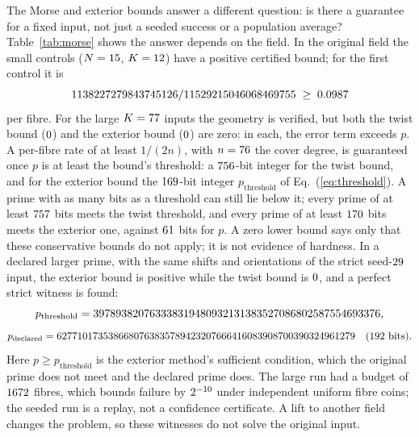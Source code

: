 \documentclass[10pt]{article}
\begin{document}
The Morse and exterior bounds answer a different question: is there a guarantee for a fixed input, not just a seeded success or a population average? Table~\ref{tab:morse} shows the answer depends on the field. In the original field the small controls ($N=15$, $K=12$) have a positive certified bound; for the first control it is
\[
1138227279843745126/11529215046068469755 \;\ge\; 0.0987
\]
per fibre. For the large $K=77$ inputs the geometry is verified, but both the twist bound ($0$) and the exterior bound ($0$) are zero: in each, the error term exceeds $p$. A per-fibre rate of at least $1/(2n)$, with $n=76$ the cover degree, is guaranteed once $p$ is at least the bound's threshold: a $756$-bit integer for the twist bound, and for the exterior bound the $169$-bit integer $p_{\text{threshold}}$ of Eq.~(\ref{eq:threshold}). A prime with as many bits as a threshold can still lie below it; every prime of at least $757$ bits meets the twist threshold, and every prime of at least $170$ bits meets the exterior one, against $61$ bits for $p$. A zero lower bound says only that these conservative bounds do not apply; it is not evidence of hardness. In a declared larger prime, with the same shifts and orientations of the strict seed-$29$ input, the exterior bound is positive while the twist bound is $0$, and a perfect strict witness is found:
\begin{equation}
\label{eq:threshold}
p_{\text{threshold}} = 397893820763338319480932131383527086802587554693376,
\end{equation}
\begin{equation}
\label{eq:primes}
p_{\text{declared}} = 6277101735386680763835789423207666416083908700390324961279 \quad (192 \text{ bits}).
\end{equation}
Here $p \ge p_{\text{threshold}}$ is the exterior method's sufficient condition, which the original prime does not meet and the declared prime does.
The large run had a budget of $1672$ fibres, which bounds failure by $2^{-10}$ under independent uniform fibre coins; the seeded run is a replay, not a confidence certificate. A lift to another field changes the problem, so these witnesses do not solve the original input.
\end{document}
